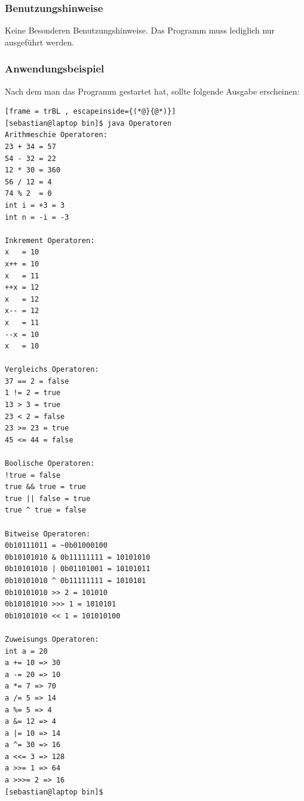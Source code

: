 \subsubsection{Benutzungshinweise}
Keine Besonderen Benutzungshinweise.
Das Programm muss lediglich nur ausgeführt werden.

\subsubsection{Anwendungsbeispiel}
Nach dem man das Programm gestartet hat, sollte folgende Ausgabe erscheinen:
\begin{lstlisting}[frame = trBL , escapeinside={(*@}{@*)}]
[sebastian@laptop bin]$ java Operatoren 
Arithmeschie Operatoren:
23 + 34 = 57
54 - 32 = 22
12 * 30 = 360
56 / 12 = 4
74 % 2  = 0
int i = +3 = 3
int n = -i = -3

Inkrement Operatoren:
x   = 10
x++ = 10
x   = 11
++x = 12
x   = 12
x-- = 12
x   = 11
--x = 10
x   = 10

Vergleichs Operatoren:
37 == 2 = false
1 != 2 = true
13 > 3 = true
23 < 2 = false
23 >= 23 = true
45 <= 44 = false

Boolische Operatoren:
!true = false
true && true = true
true || false = true
true ^ true = false

Bitweise Operatoren:
0b10111011 = ~0b01000100
0b10101010 & 0b11111111 = 10101010
0b10101010 | 0b01101001 = 10101011
0b10101010 ^ 0b11111111 = 1010101
0b10101010 >> 2 = 101010
0b10101010 >>> 1 = 1010101
0b10101010 << 1 = 101010100

Zuweisungs Operatoren:
int a = 20
a += 10 => 30
a -= 20 => 10
a *= 7 => 70
a /= 5 => 14
a %= 5 => 4
a &= 12 => 4
a |= 10 => 14
a ^= 30 => 16
a <<= 3 => 128
a >>= 1 => 64
a >>>= 2 => 16
[sebastian@laptop bin]$ 
\end{lstlisting}